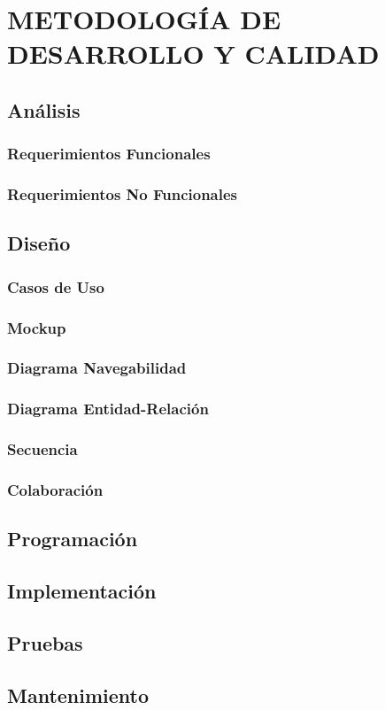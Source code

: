 \chapter{METODOLOGÍA DE DESARROLLO Y CALIDAD}
\section{Análisis}
\subsection{Requerimientos Funcionales}
\subsection{Requerimientos No Funcionales}

\section{Dise\~no}
\subsection{Casos de Uso}
\subsection{Mockup}
\subsection{Diagrama Navegabilidad}
\subsection{Diagrama Entidad-Relación}
\subsection{Secuencia}
\subsection{Colaboración}

\section{Programación}

\section{Implementación}

\section{Pruebas}

\section{Mantenimiento}